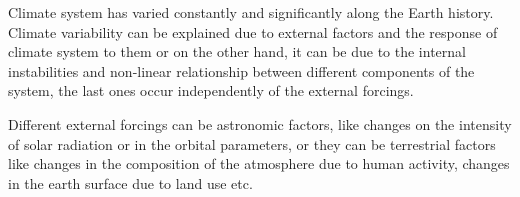 
Climate system has varied constantly and significantly along the Earth history. Climate variability can be explained due to external factors and the response of climate system to them or on the other hand, it can be due to the internal instabilities and non-linear relationship between different components of the system, the last ones occur independently of the external forcings.


Different external forcings can be astronomic factors, like changes on the intensity of solar radiation or in the orbital parameters, or they can be terrestrial factors like changes in the composition of the atmosphere due to human activity, changes in the earth surface due to land use etc.




